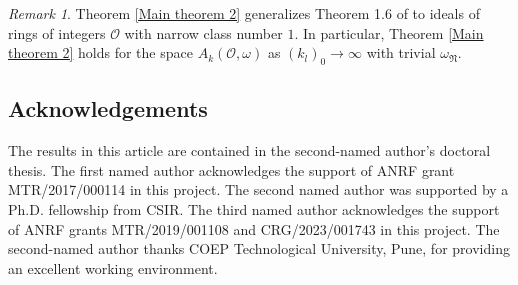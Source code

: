 \documentclass[reqno]{amsart}
\theoremstyle{plain}
\theoremstyle{definition}
\theoremstyle{remark}
\newtheorem{remark}{Remark}
\begin{document}
\begin{remark}
Theorem \ref{Main theorem 2} generalizes Theorem 1.6  of \cite{JS} to ideals of rings of integers $\mathcal{O}$ with narrow class number $1$.   In particular, Theorem \ref{Main theorem 2} holds for the space $A_k(\mathcal{O},\omega)$  as $(k_{l})_0\rightarrow \infty $  with   trivial $\omega_\mathfrak{N}$.
\end{remark}
\bigskip

\subsection*{Acknowledgements}
The results in this article are contained in the second-named author's doctoral thesis.  The first named author acknowledges the support of ANRF grant MTR/2017/000114 in this project.  The second named author was supported by a Ph.D. fellowship from CSIR.  The third named author acknowledges the support of ANRF grants MTR/2019/001108 and CRG/2023/001743 in this project.  The second-named author thanks COEP Technological University, Pune, for providing an excellent working environment. \bigskip



\end{document}
